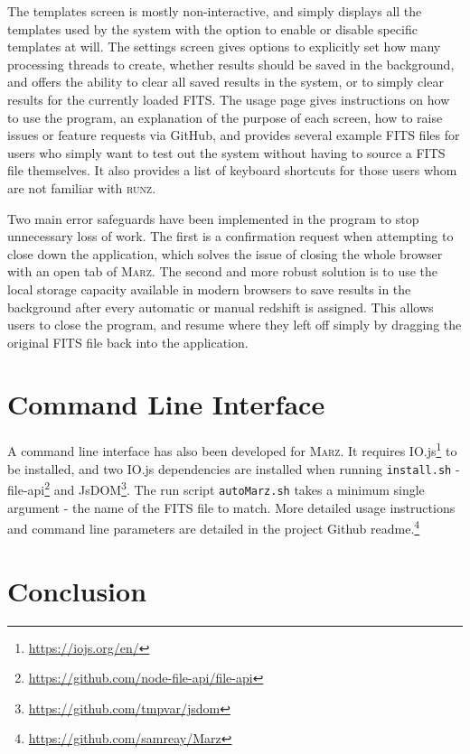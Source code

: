 \documentclass[iop]{emulateapj}
\newcommand{\runz}{\textsc{runz}}
\newcommand{\marz}{\textsc{Marz}}
\begin{document}
The templates screen is mostly non-interactive, and simply displays all the templates used by the system with the option to enable or disable specific templates at will. The settings screen gives options to explicitly set how many processing threads to create, whether results should be saved in the background, and offers the ability to clear all saved results in the system, or to simply clear results for the currently loaded FITS. The usage page gives instructions on how to use the program, an explanation of the purpose of each screen, how to raise issues or feature requests via GitHub, and provides several example FITS files for users who simply want to test out the system without having to source a FITS file themselves. It also provides a list of keyboard shortcuts for those users whom are not familiar with \runz{}.

Two main error safeguards have been implemented in the program to stop unnecessary loss of work. The first is a confirmation request when attempting to close down the application, which solves the issue of closing the whole browser with an open tab of \marz{}. The second and more robust solution is to use the local storage capacity available in modern browsers to save results in the background after every automatic or manual redshift is assigned. This allows users to close the program, and resume where they left off simply by dragging the original FITS file back into the application.






\section{Command Line Interface}

A command line interface has also been developed for \marz{}. It requires IO.js\footnote{\url{https://iojs.org/en/}} to be installed, and two IO.js dependencies are installed when running \verb;install.sh; - file-api\footnote{\url{https://github.com/node-file-api/file-api}} and JsDOM\footnote{\url{https://github.com/tmpvar/jsdom}}. The run script \verb;autoMarz.sh; takes a minimum single argument - the name of the FITS file to match. More detailed usage instructions and command line parameters are detailed in the project Github readme.\footnote{\url{https://github.com/samreay/Marz}}\\






\section{Conclusion}
\end{document}
